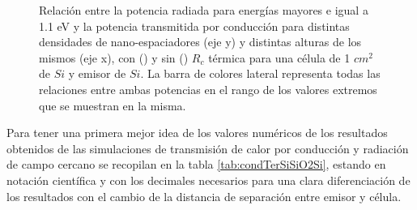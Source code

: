 \begin{figure}[H]
\begin{subfigure}[b]{0.49\textwidth}
	\caption{ }
	\label{fig:rel_SiSi11_Rc}
\end{subfigure}
\caption{\small  Relación entre la potencia radiada para energías mayores e igual a 1.1 eV y la potencia transmitida por conducción para distintas densidades de nano-espaciadores (eje y) y distintas alturas de los mismos (eje x), con () y sin () $R_c$ térmica para una célula de 1 $cm^2$ de $Si$ y emisor de $Si$. La barra de colores lateral representa todas las relaciones entre ambas potencias en el rango de los valores extremos que se muestran en la misma.
}
	\label{fig:rels_SiSi11}
\end{figure}
Para tener una primera mejor idea de los valores numéricos de los resultados obtenidos de las simulaciones de transmisión de calor por conducción y radiación de campo cercano se recopilan en la tabla \ref{tab:condTerSiSiO2Si}, estando en notación científica y con los decimales necesarios para una clara diferenciación de los resultados con el cambio de la distancia de separación entre emisor y célula.
